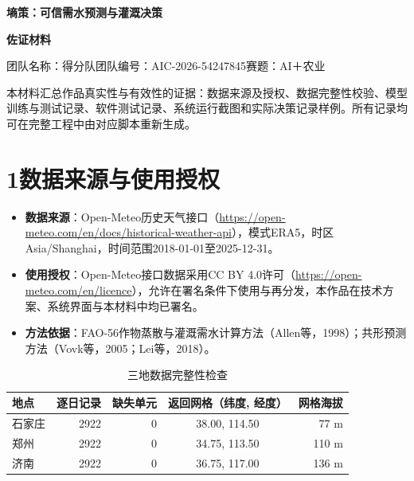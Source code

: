 \documentclass[UTF8,a4paper,11pt,fontset=fandol]{ctexart}
\begin{document}
\thispagestyle{empty}
\begin{center}
{\Large\bfseries\color{forest} 墒策：可信需水预测与灌溉决策\par}\vspace{2mm}
{\LARGE\bfseries 佐证材料\par}\vspace{3mm}
{\color{muted} 团队名称：得分队\qquad 团队编号：AIC-2026-54247845\qquad 赛题：AI＋农业\par}
\end{center}
\vspace{2mm}{\color{forest}\rule{\linewidth}{.8pt}}

本材料汇总作品真实性与有效性的证据：数据来源及授权、数据完整性校验、模型训练与测试记录、软件测试记录、系统运行截图和实际决策记录样例。所有记录均可在完整工程中由对应脚本重新生成。

\section*{1\quad 数据来源与使用授权}
\begin{itemize}
\item \textbf{数据来源}：Open-Meteo历史天气接口（\url{https://open-meteo.com/en/docs/historical-weather-api}），模式ERA5，时区Asia/Shanghai，时间范围2018-01-01至2025-12-31。
\item \textbf{使用授权}：Open-Meteo接口数据采用CC BY 4.0许可（\url{https://open-meteo.com/en/licence}），允许在署名条件下使用与再分发，本作品在技术方案、系统界面与本材料中均已署名。
\item \textbf{方法依据}：FAO-56作物蒸散与灌溉需水计算方法（Allen等，1998）；共形预测方法（Vovk等，2005；Lei等，2018）。
\end{itemize}

\begin{table}[H]\centering\small\caption{三地数据完整性检查}
\begin{tabular}{lrrcr}\toprule
地点 & 逐日记录 & 缺失单元 & 返回网格（纬度, 经度） & 网格海拔\\\midrule
石家庄 & 2922 & 0 & 38.00, 114.50 & 77 m\\
郑州 & 2922 & 0 & 34.75, 113.50 & 110 m\\
济南 & 2922 & 0 & 36.75, 117.00 & 136 m\\
\bottomrule\end{tabular}\end{table}
\end{document}

